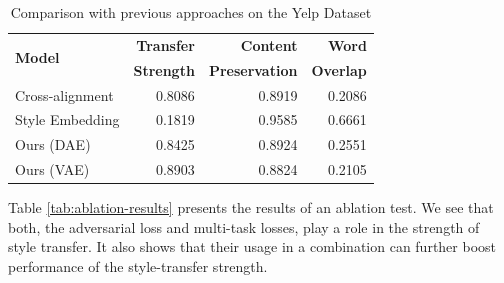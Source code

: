 \begin{table}[ht]
	\centering
	\begin{tabular}{| l | r | r | r |}
		\hline
		\multirow{2}{*}{
		\textbf{Model}}                       & \textbf{Transfer} & \textbf{Content}      & \textbf{Word}    \\
		                                      & \textbf{Strength} & \textbf{Preservation} & \textbf{Overlap} \\
		\hline
		\hline
		Cross-alignment \citep{shen2017style} & 0.8086            & 0.8919                & 0.2086           \\
		\hline
		Style Embedding \citep{fu2017style}   & 0.1819            & 0.9585                & 0.6661           \\
		\hline
		Ours (DAE)                            & 0.8425            & 0.8924                & 0.2551           \\
		\hline
		Ours (VAE)                            & 0.8903            & 0.8824                & 0.2105           \\
		\hline
	\end{tabular}
	\caption{Comparison with previous approaches on the Yelp Dataset}
	\label{tab:comparison-previous}
\end{table}


Table \ref{tab:ablation-results} presents the results of an ablation test. We see that both, the adversarial loss and multi-task losses, play a role in the strength of style transfer. It also shows that their usage in a combination can further boost performance of the style-transfer strength.

